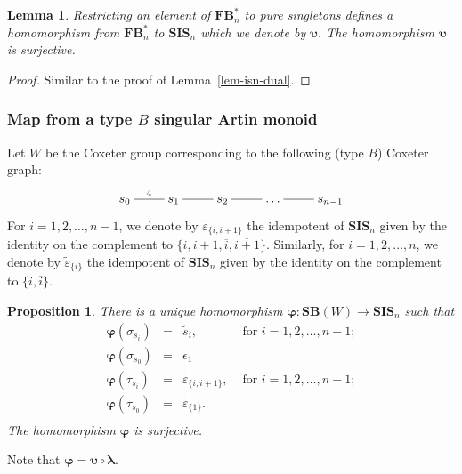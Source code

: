 \documentclass[a4paper]{amsart}
\newtheorem{lemma}[theorem]{Lemma}
\newtheorem{proposition}[theorem]{Proposition}
\begin{document}
\begin{lemma}\label{lem-isnB-dual}
Restricting an element of  $\mathbf{FB}^*_n$ to pure singletons defines a homomorphism
from $\mathbf{FB}^*_n$ to $\mathbf{SIS}_n$ which we denote by $\boldsymbol{\upsilon}$.
The homomorphism $\boldsymbol{\upsilon}$ is surjective.
\end{lemma}

\begin{proof}
Similar to the proof of Lemma~\ref{lem-isn-dual}.
\end{proof}


\subsubsection{Map from a type $B$ singular Artin monoid}\label{s4.2.5}

Let $W$ be the Coxeter group corresponding to the following (type $B$) Coxeter graph:
\begin{displaymath}
\xymatrix{s_0\ar@{-}[r]^4&s_1\ar@{-}[r]&s_2\ar@{-}[r]&\dots\ar@{-}[r]&s_{n-1}} 
\end{displaymath}
For $i=1,2,\dots,n-1$, we denote by $\tilde{\varepsilon}_{\{i,i+1\}}$
the idempotent of $\mathbf{SIS}_n$ given by the identity on the 
complement to $\{i,i+1,\overline{i},\overline{i+1}\}$.
Similarly, for $i=1,2,\dots,n$, we denote by $\tilde{\varepsilon}_{\{i\}}$
the idempotent of $\mathbf{SIS}_n$ given by the identity on the 
complement to $\{i,\overline{i}\}$.

\begin{proposition}\label{prop-4.2.5-1}
There is a unique homomorphism $\boldsymbol{\varphi}:\mathbf{SB}(W)\to\mathbf{SIS}_n$ such that
\begin{displaymath}
\begin{array}{rcll}
\boldsymbol{\varphi}(\sigma_{s_i})&=&\tilde{s}_i,&\text{ for }i=1,2,\dots,n-1;\\
\boldsymbol{\varphi}(\sigma_{s_0})&=&\epsilon_1&\\
\boldsymbol{\varphi}(\tau_{s_i})&=&
\tilde{\varepsilon}_{\{i,i+1\}},&\text{ for }i=1,2,\dots,n-1;\\ 
\boldsymbol{\varphi}(\tau_{s_0})&=&\tilde{\varepsilon}_{\{1\}}.&\\  
\end{array}
\end{displaymath}
The homomorphism $\boldsymbol{\varphi}$ is surjective.
\end{proposition}

Note that $\boldsymbol{\varphi}=\boldsymbol{\upsilon}\circ \boldsymbol{\lambda}$.
\end{document}
